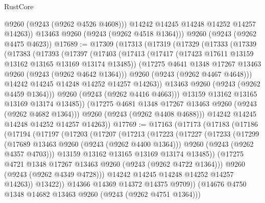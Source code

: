 \begin{lexlean}{RustCore}
\begin{coremodule}
            @9260
            (@9243 (@9262 @4526 @4608)))
          @14242
          @14245
          @14248
          @14252
          @14257
          @14263))
      @13463
      @9260
      (@9243 (@9262 @4518 @1364)))
    @9260
    (@9243 (@9262 @4475 @4623))
@17689 := @17309
    (@17313
      (@17319
        (@17329
          (@17333
            (@17339
              (@17383
                (@17393
                  (@17397
                    (@17403
                      (@17413
                        (@17417 (@17423 @17611 @13159 @13162 @13165 @13169 @13174 @13485))
                        (@17275 @4641 @1348 @17267 @13463 @9260 (@9243 (@9262 @4642 @1364)))
                        @9260
                        (@9243 (@9262 @4467 @4648)))
                      @14242
                      @14245
                      @14248
                      @14252
                      @14257
                      @14263))
                  @13463
                  @9260
                  (@9243 (@9262 @4459 @1364)))
                @9260
                (@9243 (@9262 @4416 @4663)))
              @13159
              @13162
              @13165
              @13169
              @13174
              @13485))
          (@17275 @4681 @1348 @17267 @13463 @9260 (@9243 (@9262 @4682 @1364)))
          @9260
          (@9243 (@9262 @4408 @4688)))
        @14242
        @14245
        @14248
        @14252
        @14257
        @14263))
@17769 := @17163
    (@17173
      (@17183
        (@17186
          (@17194
            (@17197
              (@17203
                (@17207
                  (@17213
                    (@17223
                      (@17227
                        (@17233
                          (@17299
                            (@17689 @13463 @9260 (@9243 (@9262 @4400 @1364)))
                            @9260
                            (@9243 (@9262 @4357 @4703)))
                          @13159
                          @13162
                          @13165
                          @13169
                          @13174
                          @13485))
                      (@17275 @4721 @1348 @17267 @13463 @9260 (@9243 (@9262 @4722 @1364)))
                      @9260
                      (@9243 (@9262 @4349 @4728)))
                    @14242
                    @14245
                    @14248
                    @14252
                    @14257
                    @14263))
                @13422))
            @14366
            @14369
            @14372
            @14375
            @9709))
        (@14676 @4750 @1348 @14682 @13463 @9260 (@9243 (@9262 @4751 @1364)))

\end{coremodule}
\end{lexlean}
